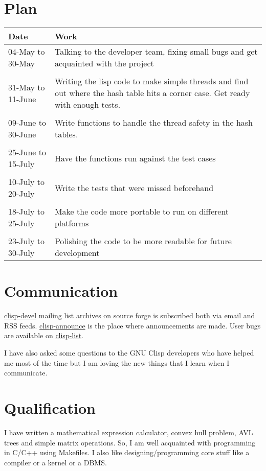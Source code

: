 \documentclass[11pt]{article}
\begin{document}
\section*{Plan}
\label{sec:org21094fd}
\begin{center}
\begin{tabular}{ll}
Date & Work\\
\hline
04-May to 30-May & Talking to the developer team, fixing small bugs and get acquainted with the project\\
 & \\
31-May to 11-June & Writing the lisp code to make simple threads and find out where the hash table hits a corner case. Get ready with enough tests.\\
 & \\
09-June to 30-June & Write functions to handle the thread safety in the hash tables.\\
 & \\
25-June to 15-July & Have the functions run against the test cases\\
 & \\
10-July to 20-July & Write the tests that were missed beforehand\\
 & \\
18-July to 25-July & Make the code more portable to run on different platforms\\
 & \\
23-July to 30-July & Polishing the code to be more readable for future development\\
\end{tabular}
\end{center}
\section*{Communication}
\label{sec:org5253a2c}
\href{https://sourceforge.net/p/clisp/mailman/clisp-devel/}{clisp-devel} mailing list archives on source forge is subscribed both via email
and RSS feeds. \href{https://sourceforge.net/p/clisp/mailman/clisp-announce/}{clisp-announce} is the place where announcements are made.
User bugs are available on \href{https://sourceforge.net/p/clisp/mailman/clisp-list/}{clisp-list}.

I have also asked some questions to the GNU Clisp developers who have helped me
most of the time but I am loving the new things that I learn when I communicate.
\section*{Qualification}
\label{sec:org5fc5c1d}
I have written a mathematical expression calculator, convex hull problem, AVL
trees and simple matrix operations. So, I am well acquainted with programming in
C/C++ using Makefiles. I also like designing/programming core stuff like a
compiler or a kernel or a DBMS.
\end{document}
